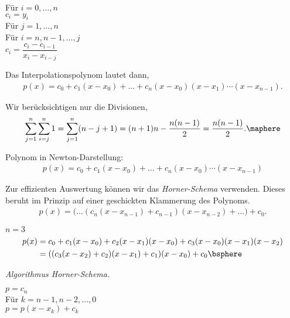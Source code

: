 \begin{tabbing}
\hspace{20pt}	Für $i=0,\ldots,n$\\
\hspace{40pt}		$c_i = y_i$\\	
\hspace{20pt}	Für $j=1,\ldots,n$\\
\hspace{40pt}		Für $i=n,n-1,\ldots,j$\\
\hspace{60pt}			$c_i = \dfrac{c_i - c_{i-1}}{x_i -x_{i-j}}$\\
\end{tabbing}
Das Interpolationspolynom lautet dann,
\begin{align*}
p(x) = c_0 + c_1(x-x_0) + \ldots + c_n(x-x_0)(x-x_1)\cdots(x-x_{n-1}).
\end{align*}

\begin{bemn}[Rechenaufwand.] Wir berücksichtigen nur die Divisionen,
\begin{align*}
\sum\limits_{j=1}^n\sum\limits_{i=j}^n 1 = \sum\limits_{j=1}^n (n-j+1) = (n+1)n
- \frac{n(n-1)}{2}=\frac{n(n-1)}{2}.\maphere
\end{align*}
\end{bemn}

Polynom in Newton-Darstellung:
\begin{align*}
p(x) = c_0 + c_1(x-x_0) + \ldots + c_n(x-x_0)\cdots(x-x_{n-1})
\end{align*}

Zur effizienten Auswertung können wir das \emph{Horner-Schema} verwenden. Dieses
beruht im Prinzip auf einer geschickten Klammerung des Polynoms.
\begin{align*}
p(x) = \bigg(\ldots\left(c_n(x-x_{n-1})+c_{n-1}\right) (x-x_{n-2}) +
\ldots\bigg)+c_0.
\end{align*}
\begin{bspn} $n=3$
\begin{align*}
p(x) &= c_0 + c_1(x-x_0) + c_2(x-x_1)(x-x_0) + c_3(x-x_0)(x-x_1)(x-x_2)\\
&= ((c_3(x-x_2)+c_2)(x-x_1)+c_1)(x-x_0) + c_0\bsphere
\end{align*}
\end{bspn}
\textit{Algorithmus Horner-Schema.}

\begin{tabbing}
\hspace{20pt}	$p=c_n$\\
\hspace{20pt}	Für $k=n-1,n-2,\ldots,0$\\
\hspace{40pt}		$p = p(x-x_k)+c_k$\\
\end{tabbing}

